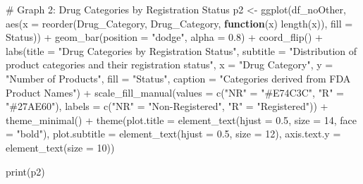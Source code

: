 \documentclass[
  letterpaper,
  DIV=11,
  numbers=noendperiod]{scrartcl}
\newenvironment{Shaded}{\begin{snugshade}}{\end{snugshade}}
\newcommand{\AttributeTok}[1]{\textcolor[rgb]{0.40,0.45,0.13}{#1}}
\newcommand{\CommentTok}[1]{\textcolor[rgb]{0.37,0.37,0.37}{#1}}
\newcommand{\ControlFlowTok}[1]{\textcolor[rgb]{0.00,0.23,0.31}{\textbf{#1}}}
\newcommand{\DecValTok}[1]{\textcolor[rgb]{0.68,0.00,0.00}{#1}}
\newcommand{\FloatTok}[1]{\textcolor[rgb]{0.68,0.00,0.00}{#1}}
\newcommand{\FunctionTok}[1]{\textcolor[rgb]{0.28,0.35,0.67}{#1}}
\newcommand{\NormalTok}[1]{\textcolor[rgb]{0.00,0.23,0.31}{#1}}
\newcommand{\OtherTok}[1]{\textcolor[rgb]{0.00,0.23,0.31}{#1}}
\newcommand{\SpecialCharTok}[1]{\textcolor[rgb]{0.37,0.37,0.37}{#1}}
\newcommand{\StringTok}[1]{\textcolor[rgb]{0.13,0.47,0.30}{#1}}
\begin{document}
\begin{Shaded}
\begin{Highlighting}[]
\CommentTok{\# Graph 2: Drug Categories by Registration Status}
\NormalTok{p2 }\OtherTok{\textless{}{-}} \FunctionTok{ggplot}\NormalTok{(df\_noOther, }\FunctionTok{aes}\NormalTok{(}\AttributeTok{x =} \FunctionTok{reorder}\NormalTok{(Drug\_Category, Drug\_Category, }\ControlFlowTok{function}\NormalTok{(x) }\FunctionTok{length}\NormalTok{(x)), }
                     \AttributeTok{fill =}\NormalTok{ Status)) }\SpecialCharTok{+}
  \FunctionTok{geom\_bar}\NormalTok{(}\AttributeTok{position =} \StringTok{"dodge"}\NormalTok{, }\AttributeTok{alpha =} \FloatTok{0.8}\NormalTok{) }\SpecialCharTok{+}
  \FunctionTok{coord\_flip}\NormalTok{() }\SpecialCharTok{+}
  \FunctionTok{labs}\NormalTok{(}\AttributeTok{title =} \StringTok{"Drug Categories by Registration Status"}\NormalTok{,}
       \AttributeTok{subtitle =} \StringTok{"Distribution of product categories and their registration status"}\NormalTok{,}
       \AttributeTok{x =} \StringTok{"Drug Category"}\NormalTok{,}
       \AttributeTok{y =} \StringTok{"Number of Products"}\NormalTok{,}
       \AttributeTok{fill =} \StringTok{"Status"}\NormalTok{,}
       \AttributeTok{caption =} \StringTok{"Categories derived from FDA Product Names"}\NormalTok{) }\SpecialCharTok{+}
  \FunctionTok{scale\_fill\_manual}\NormalTok{(}\AttributeTok{values =} \FunctionTok{c}\NormalTok{(}\StringTok{"NR"} \OtherTok{=} \StringTok{"\#E74C3C"}\NormalTok{, }\StringTok{"R"} \OtherTok{=} \StringTok{"\#27AE60"}\NormalTok{),}
                    \AttributeTok{labels =} \FunctionTok{c}\NormalTok{(}\StringTok{"NR"} \OtherTok{=} \StringTok{"Non{-}Registered"}\NormalTok{, }\StringTok{"R"} \OtherTok{=} \StringTok{"Registered"}\NormalTok{)) }\SpecialCharTok{+}
  \FunctionTok{theme\_minimal}\NormalTok{() }\SpecialCharTok{+}
  \FunctionTok{theme}\NormalTok{(}\AttributeTok{plot.title =} \FunctionTok{element\_text}\NormalTok{(}\AttributeTok{hjust =} \FloatTok{0.5}\NormalTok{, }\AttributeTok{size =} \DecValTok{14}\NormalTok{, }\AttributeTok{face =} \StringTok{"bold"}\NormalTok{),}
        \AttributeTok{plot.subtitle =} \FunctionTok{element\_text}\NormalTok{(}\AttributeTok{hjust =} \FloatTok{0.5}\NormalTok{, }\AttributeTok{size =} \DecValTok{12}\NormalTok{),}
        \AttributeTok{axis.text.y =} \FunctionTok{element\_text}\NormalTok{(}\AttributeTok{size =} \DecValTok{10}\NormalTok{))}

\FunctionTok{print}\NormalTok{(p2)}
\end{Highlighting}
\end{Shaded}
\end{document}
